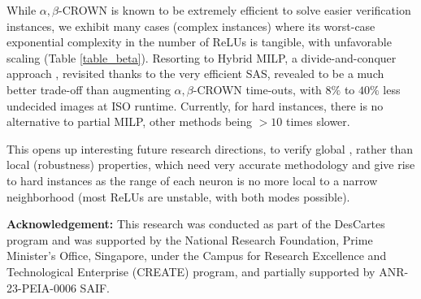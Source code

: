 \documentclass[runningheads]{llncs}
\begin{document}
While $\alpha,\beta$-CROWN is known to be extremely efficient to solve easier verification instances, we exhibit many cases (complex instances) where its worst-case exponential complexity in the number of ReLUs is tangible, with unfavorable scaling (Table \ref{table_beta}). Resorting to Hybrid MILP, a divide-and-conquer approach \cite{DivideAndSlide}, revisited thanks to the very efficient {\sf SAS}, revealed to be a much better trade-off than augmenting $\alpha,\beta$-CROWN time-outs, with $8\%$ to $40\%$ less undecided images at ISO runtime. Currently, for hard instances, there is no alternative to partial MILP, other methods being $>10$ times slower.

This opens up interesting future research directions, 
to verify global \cite{lipshitz}, rather than local (robustness) properties, which need very accurate methodology
and give rise to hard instances as the range of each neuron is no more local to a narrow neighborhood 
(most ReLUs are unstable, with both modes possible).




\smallskip
{\bf Acknowledgement:} 
This research was conducted as part of the DesCartes program and 
was supported by the National Research Foundation, Prime Minister's Office, Singapore, 
under the Campus for Research Excellence and Technological Enterprise
(CREATE) program, and partially supported by ANR-23-PEIA-0006 SAIF.




\end{document}
